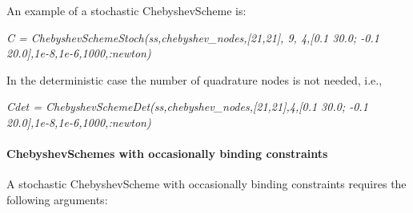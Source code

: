 \documentclass[notitlepage,11pt]{article}
\begin{document}
\bigskip

An example of a stochastic ChebyshevScheme is:

\bigskip

\textit{C = ChebyshevSchemeStoch(ss,chebyshev\_nodes,[21,21], 9, 4,[0.1
30.0; -0.1 20.0],1e-8,1e-6,1000,:newton)}

\bigskip

In the deterministic case the number of quadrature nodes is not needed, i.e.,

\bigskip

\textit{Cdet = ChebyshevSchemeDet(ss,chebyshev\_nodes,[21,21],4,[0.1 30.0;
-0.1 20.0],1e-8,1e-6,1000,:newton)}

\paragraph{ChebyshevSchemes with occasionally binding constraints}

A stochastic ChebyshevScheme with occasionally binding constraints requires
the following arguments:
\end{document}
